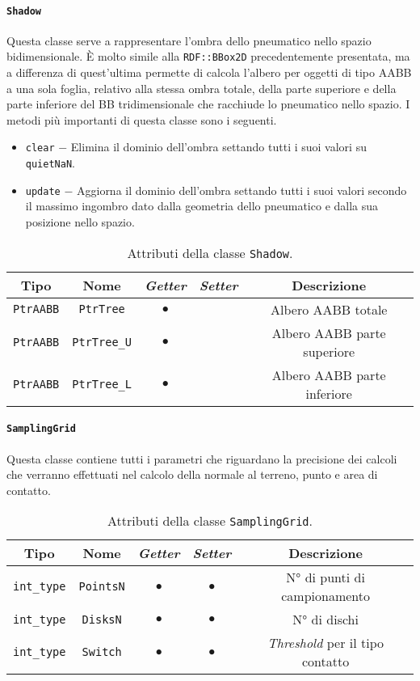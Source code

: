 \paragraph{\texttt{Shadow}}
Questa classe serve a rappresentare l'ombra dello pneumatico nello spazio bidimensionale. È molto simile alla \texttt{RDF::BBox2D} precedentemente presentata, ma a differenza di quest'ultima permette di calcola l'albero per oggetti di tipo \ac{AABB} a una sola foglia, relativo alla stessa ombra totale, della parte superiore e della parte inferiore del \ac{BB} tridimensionale che racchiude lo pneumatico nello spazio. I metodi più importanti di questa classe sono i seguenti.
\begin{itemize}
	\item \texttt{clear} $-$ Elimina il dominio dell'ombra settando tutti i suoi valori su \texttt{quietNaN}.
	\item \texttt{update} $-$ Aggiorna il dominio dell'ombra settando tutti i suoi valori secondo il massimo ingombro dato dalla geometria dello pneumatico e dalla sua posizione nello spazio.
\end{itemize}
\begin{table}[h!]
	\centering
	\begin{tabular}{|c|c|c|c|c|}
		\hline 
		\textbf{Tipo} & \textbf{Nome} & \textit{\textbf{Getter}} & \textit{\textbf{Setter}} & \textbf{Descrizione} \\ \hline 
		\texttt{PtrAABB} & \texttt{PtrTree} & $\bullet$ & & Albero \ac{AABB} totale\\ \hline
		\texttt{PtrAABB} & \texttt{PtrTree\_U} & $\bullet$ & & Albero \ac{AABB} parte superiore \\ \hline
		\texttt{PtrAABB} & \texttt{PtrTree\_L} & $\bullet$ & & Albero \ac{AABB} parte inferiore \\ \hline
	\end{tabular}
	\caption{Attributi della classe \texttt{Shadow}.}
	\label{}
\end{table}
%
\paragraph{\texttt{SamplingGrid}}
Questa classe contiene tutti i parametri che riguardano la precisione dei calcoli che verranno effettuati nel calcolo della normale al terreno, punto e area di contatto.
\begin{table}[h!]
	\centering
	\begin{tabular}{|c|c|c|c|c|}
		\hline 
		\textbf{Tipo} & \textbf{Nome} & \textit{\textbf{Getter}} & \textit{\textbf{Setter}} & \textbf{Descrizione} \\ \hline 
		\texttt{int\_type} & \texttt{PointsN} & $\bullet$ & $\bullet$ & N° di punti di campionamento \\ \hline 
		\texttt{int\_type} & \texttt{DisksN} & $\bullet$ & $\bullet$ & N° di dischi \\ \hline 
		\texttt{int\_type} & \texttt{Switch} & $\bullet$ & $\bullet$ & \textit{Threshold} per il tipo contatto \\ \hline
	\end{tabular}
	\caption{Attributi della classe \texttt{SamplingGrid}.}
	\label{}
\end{table}
%
